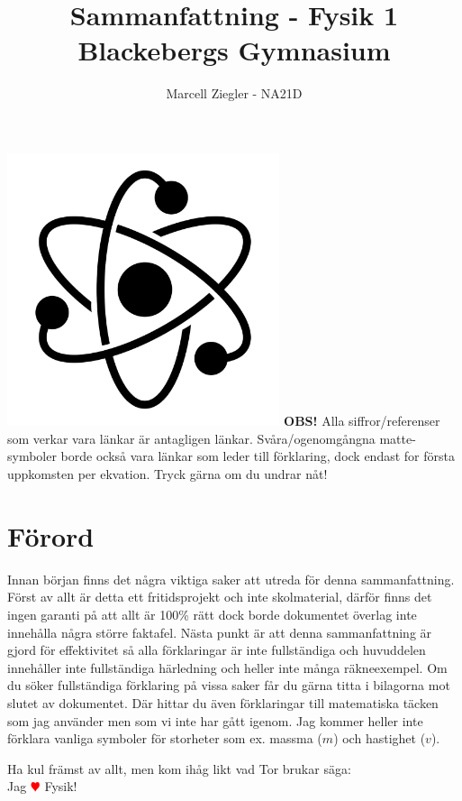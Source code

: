 \documentclass[12pt, a4paper]{article}
\title{Sammanfattning - Fysik 1 \\ Blackebergs Gymnasium}
\author{Marcell Ziegler - NA21D}
\theoremstyle{definition}
\begin{document}
\begin{titlepage}
    \maketitle
    \centering
    \vfill
    \includegraphics[width=0.6\textwidth]{title.jpg}
    \vfill
    \textbf{OBS!} Alla siffror/referenser som verkar vara länkar är antagligen länkar. Svåra/ogenomgångna matte-symboler borde också vara länkar som leder till förklaring, dock endast for första uppkomsten per ekvation. Tryck gärna om du undrar nåt!
\end{titlepage}

\tableofcontents

\newpage

\section*{Förord}
Innan början finns det några viktiga saker att utreda för denna sammanfattning. Först av allt är detta ett fritidsprojekt och inte skolmaterial, därför finns det ingen garanti på att allt är 100\% rätt dock borde dokumentet överlag inte innehålla några större faktafel. Nästa punkt är att denna sammanfattning är gjord för effektivitet så alla förklaringar är inte fullständiga och huvuddelen innehåller inte fullständiga härledning och heller inte många räkneexempel. Om du söker fullständiga förklaring på vissa saker får du gärna titta i bilagorna mot slutet av dokumentet. Där hittar du även förklaringar till matematiska täcken som jag använder men som vi inte har gått igenom. Jag kommer heller inte förklara vanliga symboler för storheter som ex. massma ($m$) och hastighet ($v$).
\begin{center}
    \large{Ha kul främst av allt, men kom ihåg likt vad Tor brukar säga:}\\
    \Large{Jag \textcolor{red}{$\varheartsuit$} Fysik!}
\end{center}
\end{document}

